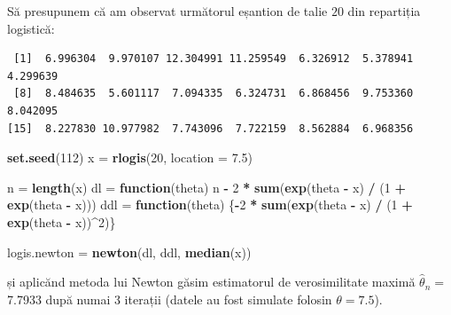 \documentclass[]{article}
\newenvironment{Shaded}{\begin{snugshade}}{\end{snugshade}}
\newcommand{\KeywordTok}[1]{\textcolor[rgb]{0.13,0.29,0.53}{\textbf{#1}}}
\newcommand{\DataTypeTok}[1]{\textcolor[rgb]{0.13,0.29,0.53}{#1}}
\newcommand{\DecValTok}[1]{\textcolor[rgb]{0.00,0.00,0.81}{#1}}
\newcommand{\FloatTok}[1]{\textcolor[rgb]{0.00,0.00,0.81}{#1}}
\newcommand{\StringTok}[1]{\textcolor[rgb]{0.31,0.60,0.02}{#1}}
\newcommand{\ControlFlowTok}[1]{\textcolor[rgb]{0.13,0.29,0.53}{\textbf{#1}}}
\newcommand{\OperatorTok}[1]{\textcolor[rgb]{0.81,0.36,0.00}{\textbf{#1}}}
\newcommand{\NormalTok}[1]{#1}
\begin{document}
Să presupunem că am observat următorul eșantion de talie \(20\) din
repartiția logistică:

\begin{verbatim}
 [1]  6.996304  9.970107 12.304991 11.259549  6.326912  5.378941  4.299639
 [8]  8.484635  5.601117  7.094335  6.324731  6.868456  9.753360  8.042095
[15]  8.227830 10.977982  7.743096  7.722159  8.562884  6.968356
\end{verbatim}

\begin{Shaded}
\begin{Highlighting}[]
\KeywordTok{set.seed}\NormalTok{(}\DecValTok{112}\NormalTok{)}
\NormalTok{x =}\StringTok{ }\KeywordTok{rlogis}\NormalTok{(}\DecValTok{20}\NormalTok{, }\DataTypeTok{location =} \FloatTok{7.5}\NormalTok{)}

\NormalTok{n =}\StringTok{ }\KeywordTok{length}\NormalTok{(x)}
\NormalTok{dl =}\StringTok{ }\ControlFlowTok{function}\NormalTok{(theta) n }\OperatorTok{-}\StringTok{ }\DecValTok{2} \OperatorTok{*}\StringTok{ }\KeywordTok{sum}\NormalTok{(}\KeywordTok{exp}\NormalTok{(theta }\OperatorTok{-}\StringTok{ }\NormalTok{x) }\OperatorTok{/}\StringTok{ }\NormalTok{(}\DecValTok{1} \OperatorTok{+}\StringTok{ }\KeywordTok{exp}\NormalTok{(theta }\OperatorTok{-}\StringTok{ }\NormalTok{x)))}
\NormalTok{ddl =}\StringTok{ }\ControlFlowTok{function}\NormalTok{(theta) \{}\OperatorTok{-}\DecValTok{2} \OperatorTok{*}\StringTok{ }\KeywordTok{sum}\NormalTok{(}\KeywordTok{exp}\NormalTok{(theta }\OperatorTok{-}\StringTok{ }\NormalTok{x) }\OperatorTok{/}\StringTok{ }\NormalTok{(}\DecValTok{1} \OperatorTok{+}\StringTok{ }\KeywordTok{exp}\NormalTok{(theta }\OperatorTok{-}\StringTok{ }\NormalTok{x))}\OperatorTok{^}\DecValTok{2}\NormalTok{)\}}

\NormalTok{logis.newton =}\StringTok{ }\KeywordTok{newton}\NormalTok{(dl, ddl, }\KeywordTok{median}\NormalTok{(x))}
\end{Highlighting}
\end{Shaded}

și aplicănd metoda lui Newton găsim estimatorul de verosimilitate maximă
\(\hat{\theta}_n=\) 7.7933 după numai 3 iterații (datele au fost
simulate folosin \(\theta = 7.5\)).
\end{document}
